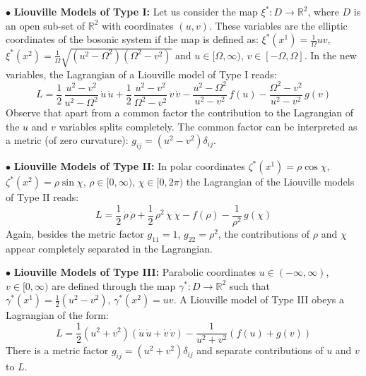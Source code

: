 \documentclass[a4paper,11pt,twoside]{article}
\def\r{\mathbb R}                   %
\begin{document}
\noindent $\bullet$ {\bf Liouville Models of Type I:} Let us consider the map $\xi^*:D
\longrightarrow {\r}^2$, where $D$ is an open sub-set of ${\r}^2$ with coordinates $(u,v)$. These variables are the elliptic
coordinates of the bosonic system if the map is defined as:
$\xi^{*}(x^1)=\frac{1}{\Omega} u v$, $\xi^{*}(x^2)=\frac{1}{\Omega} \sqrt{(u^2-\Omega^2)(\Omega^2-v^2)}$ and
 $u \in [\Omega,\infty)$, $v \in [-\Omega, \Omega]$.
In the new variables, the Lagrangian  of a Liouville model of Type
I reads:
\begin{equation}
L = \displaystyle\frac{1}{2}\, \displaystyle\frac{u^2-v^2}{u^2-\Omega^2} \, \dot{u}\, \dot{u}+ \displaystyle\frac{1}{2} \, \displaystyle\frac{u^2-v^2}{\Omega^2-v^2} \, \dot{v}\, \dot{v}
- \displaystyle\frac{u^2-\Omega^2}{u^2-v^2} \,  f(u)-\displaystyle\frac{\Omega^2-v^2}{u^2-v^2} \, g(v)
\label{eq:Liou1}
\end{equation}
Observe that apart from a common factor the contribution to the
Lagrangian of the $u$ and $v$ variables splits completely. The
common factor can be interpreted as a metric (of zero curvature):
$g_{ij}=(u^2-v^2) \delta_{ij}$.

\vspace*{0.1cm}

\noindent $\bullet$ {\bf Liouville Models of Type II:} In polar coordinates $\zeta^{*}(x^1)=\rho \cos \chi$, $\zeta^{*}(x^2)=\rho \sin \chi$, $\rho \in [0,\infty)$, $\chi\in [0,2\pi)$
the Lagrangian of the Liouville models of Type II reads:
\begin{equation}
L = \displaystyle\frac{1}{2} \, \dot{\rho} \, \dot{\rho} +
\displaystyle\frac{1}{2} \,\rho^2 \,\dot{\chi} \, \dot{\chi}
-f(\rho)-\frac{1}{\rho^2} \, g(\chi)
\label{eq:liou2}
\end{equation}
Again, besides the metric factor  $g_{11}=1$, $g_{22}=\rho^2$,
the contributions of $\rho$ and $\chi$ appear completely separated
in the Lagrangian.

\vspace*{0.1cm}

\noindent $\bullet$ {\bf Liouville Models of Type III:} Parabolic
coordinates $u\in (-\infty,\infty)$, $v\in [0,\infty)$ are defined
through the map $\gamma^{*}: D\longrightarrow {\r}^2$ such that
$\gamma^{*}(x^1)=\frac{1}{2} (u^2-v^2)$, $\gamma^{*}(x^2)=u v$. A
Liouville model of Type III obeys a Lagrangian of the form:
\begin{equation}
L = \displaystyle\frac{1}{2} (u^2+v^2) \left( \dot{u} \, \dot{u} +\dot{v} \, \dot{v} \right)
-\displaystyle\frac{1}{u^2+v^2} \left( f(u)+g(v) \right)
\label{eq:liou3}
\end{equation}
There is a metric factor $g_{ij}=(u^2+v^2) \delta_{ij}$ and
separate contributions of $u$ and $v$ to $L$.
\end{document}
